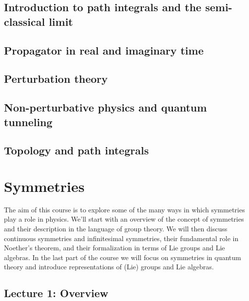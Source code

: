 \documentclass{book}
\theoremstyle{definition}
\begin{document}
\newpage

\section{Introduction to path integrals and the semi-classical limit}

\newpage
\section{Propagator in real and imaginary time}


\newpage

\section{Perturbation theory}


\newpage

\section{Non-perturbative physics and quantum tunneling}


\newpage


\section{Topology and path integrals}


\newpage



\chapter{Symmetries}



The aim of this course is to  explore some of the many ways in which symmetries play a role in physics. We’ll start with an overview of the concept of symmetries and their description in the language of  group theory. We will then discuss continuous symmetries and infinitesimal symmetries, their fundamental role in Noether's theorem, and their formalization in terms of Lie groups and Lie algebras. In the last part of the course we will focus on symmetries in quantum theory and introduce representations of (Lie) groups and Lie algebras.


\newpage

\section{Lecture 1: Overview}
\end{document}
